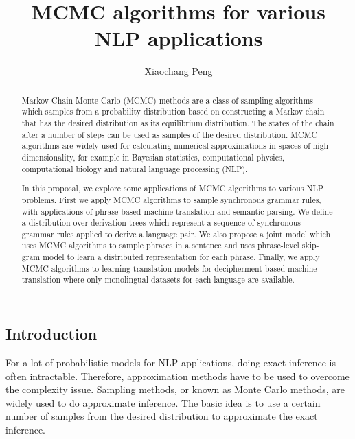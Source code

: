 \documentclass[12pt,leqno]{report}
\begin{document}
\begin{CJK}{UTF8}{cyberbit}

\title{MCMC algorithms for various NLP applications}
\author{Xiaochang Peng}


\maketitle

\thispagestyle{empty}

\begin{abstract}
Markov Chain Monte Carlo (MCMC) methods are a class of sampling algorithms which samples from a probability distribution based on constructing a Markov chain that has the desired distribution as its equilibrium distribution. The states of the chain after a number of steps can be used as samples of the desired distribution. 
MCMC algorithms are widely used for calculating numerical approximations in spaces of high dimensionality, for example in Bayesian statistics, computational physics, computational biology and natural language processing (NLP).


In this proposal, we explore some applications of MCMC algorithms to various NLP problems. First we apply MCMC algorithms to sample synchronous grammar rules, with applications of phrase-based machine translation and semantic parsing. We define a distribution over derivation trees which represent a sequence of synchronous grammar rules applied to derive a language pair. We also propose a joint model which uses MCMC algorithms to sample phrases in a sentence and uses phrase-level
skip-gram model to learn a distributed representation for each phrase. Finally, we apply MCMC algorithms to learning translation models for decipherment-based machine translation where only monolingual datasets for each language are available.
\end{abstract}

\tableofcontents

\chapter{Introduction}

For a lot of probabilistic models for NLP applications, doing exact inference is often intractable. Therefore, approximation methods have to be used to overcome the
complexity issue. Sampling methods, or known as Monte Carlo methods, are widely used to do approximate inference. The basic idea is to use a certain number of
samples from the desired distribution to approximate the exact inference.



\end{CJK}
\end{document}
